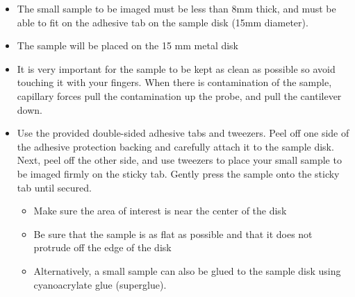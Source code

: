 \documentclass{../lab}
\begin{document}
    \begin{itemize}
        \item The small sample to be imaged must be less than 8mm thick, and must be able to fit on the adhesive tab on the sample disk (15mm diameter).

        \item The sample will be placed on the 15 mm metal disk

        \item It is very important for the sample to be kept as clean as possible so avoid touching it with your fingers.  When there is contamination of the sample, capillary forces pull the contamination up the probe, and pull the cantilever down.

        \item Use the provided double-sided adhesive tabs and tweezers.  Peel off one side of the adhesive protection backing and carefully attach it to the sample disk.  Next, peel off the other side, and use tweezers to place your small sample to be imaged firmly on the sticky tab.  Gently press the sample onto the sticky tab until secured.

    \begin{itemize}
        \item Make sure the area of interest is near the center of the disk

        \item Be sure that the sample is as flat as possible and that it does not protrude off the edge of the disk

        \item Alternatively, a small sample can also be glued to the sample disk using cyanoacrylate glue (superglue).

    \end{itemize}

    \end{itemize}
\end{document}
